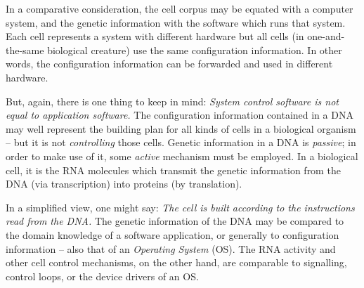 In a comparative consideration, the cell corpus may be equated with a computer
system, and the genetic information with the software which runs that system.
Each cell represents a system with different hardware but all cells
(in one-and-the-same biological creature) use the same configuration
information. In other words, the configuration information can be forwarded and
used in different hardware.

But, again, there is one thing to keep in mind: \emph{System control software
is not equal to application software.} The configuration information contained
in a DNA may well represent the building plan for all kinds of cells in a
biological organism -- but it is not \emph{controlling} those cells. Genetic
information in a DNA is \emph{passive}; in order to make use of it, some
\emph{active} mechanism must be employed. In a biological cell, it is the RNA
molecules which transmit the genetic information from the DNA
(via transcription) into proteins (by translation).

In a simplified view, one might say: \textit{The cell is built according to the
instructions read from the DNA.} The genetic information of the DNA may be
compared to the domain knowledge of a software application, or generally to
configuration information -- also that of an \emph{Operating System} (OS).
The RNA activity and other cell control mechanisms, on the other hand, are
comparable to signalling, control loops, or the device drivers of an OS.
